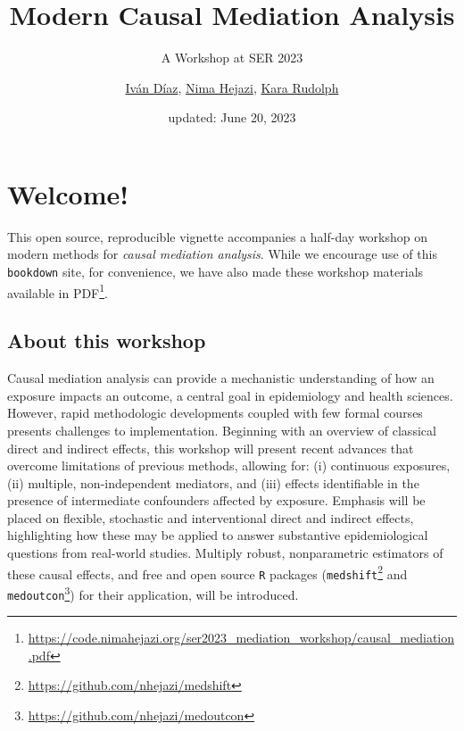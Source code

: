\documentclass[
  12pt,
]{book}
\title{Modern Causal Mediation Analysis}
\subtitle{A Workshop at SER 2023}
\author{\href{https://www.idiaz.xyz/}{Iván Díaz}, \href{https://nimahejazi.org}{Nima Hejazi}, \href{https://kararudolph.github.io/}{Kara Rudolph}}
\date{updated: June 20, 2023}
\newcommand{\passthrough}[1]{#1}
\renewcommand{\href}[2]{#2\footnote{\url{#1}}}
\theoremstyle{definition}
\theoremstyle{definition}
\theoremstyle{definition}
\newcommand{\1}{\mathbbm{1}}
\begin{document}
\maketitle


\thispagestyle{empty}

\begin{center}
\end{center}

\setlength{\abovedisplayskip}{-5pt}
\setlength{\abovedisplayshortskip}{-5pt}

\mainmatter

{
\hypersetup{linkcolor=}
\setcounter{tocdepth}{2}
\tableofcontents
}
\hypertarget{welcome}{%
\chapter*{Welcome!}\label{welcome}}


This open source, reproducible vignette accompanies a half-day workshop on
modern methods for \emph{causal mediation analysis}. While we encourage use of this
\passthrough{\lstinline!bookdown!} site, for convenience, we have also made these workshop materials
\href{https://code.nimahejazi.org/ser2023_mediation_workshop/causal_mediation.pdf}{available in
PDF}.

\hypertarget{about}{%
\section{About this workshop}\label{about}}

Causal mediation analysis can provide a mechanistic understanding of how an
exposure impacts an outcome, a central goal in epidemiology and health sciences.
However, rapid methodologic developments coupled with few formal courses
presents challenges to implementation. Beginning with an overview of classical
direct and indirect effects, this workshop will present recent advances that
overcome limitations of previous methods, allowing for: (i) continuous
exposures, (ii) multiple, non-independent mediators, and (iii) effects
identifiable in the presence of intermediate confounders affected by exposure.
Emphasis will be placed on flexible, stochastic and interventional direct and
indirect effects, highlighting how these may be applied to answer substantive
epidemiological questions from real-world studies. Multiply robust,
nonparametric estimators of these causal effects, and free and open source \passthrough{\lstinline!R!}
packages (\href{https://github.com/nhejazi/medshift}{\passthrough{\lstinline!medshift!}} and
\href{https://github.com/nhejazi/medoutcon}{\passthrough{\lstinline!medoutcon!}}) for their application, will
be introduced.
\end{document}
